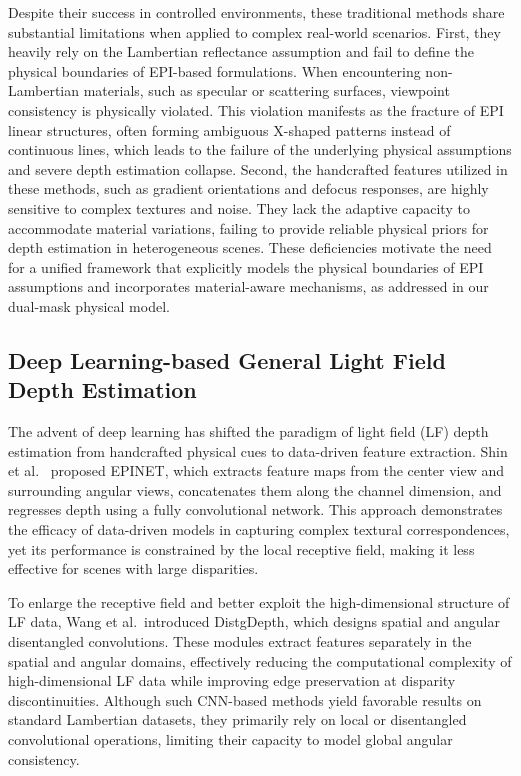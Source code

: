\documentclass[lettersize,journal]{IEEEtran}
\begin{document}
Despite their success in controlled environments, these traditional methods share substantial limitations when applied to complex real-world scenarios. First, they heavily rely on the Lambertian reflectance assumption and fail to define the physical boundaries of EPI-based formulations. When encountering non-Lambertian materials, such as specular or scattering surfaces, viewpoint consistency is physically violated. This violation manifests as the fracture of EPI linear structures, often forming ambiguous X-shaped patterns instead of continuous lines, which leads to the failure of the underlying physical assumptions and severe depth estimation collapse. Second, the handcrafted features utilized in these methods, such as gradient orientations and defocus responses, are highly sensitive to complex textures and noise. They lack the adaptive capacity to accommodate material variations, failing to provide reliable physical priors for depth estimation in heterogeneous scenes. These deficiencies motivate the need for a unified framework that explicitly models the physical boundaries of EPI assumptions and incorporates material-aware mechanisms, as addressed in our dual-mask physical model.

\subsection{Deep Learning-based General Light Field Depth Estimation}

The advent of deep learning has shifted the paradigm of light field (LF) depth estimation from handcrafted physical cues to data-driven feature extraction. Shin et al.\ \cite{dosovitskiy2021} proposed EPINET, which extracts feature maps from the center view and surrounding angular views, concatenates them along the channel dimension, and regresses depth using a fully convolutional network. This approach demonstrates the efficacy of data-driven models in capturing complex textural correspondences, yet its performance is constrained by the local receptive field, making it less effective for scenes with large disparities.

To enlarge the receptive field and better exploit the high-dimensional structure of LF data, Wang et al.\ introduced DistgDepth, which designs spatial and angular disentangled convolutions. These modules extract features separately in the spatial and angular domains, effectively reducing the computational complexity of high-dimensional LF data while improving edge preservation at disparity discontinuities. Although such CNN-based methods yield favorable results on standard Lambertian datasets, they primarily rely on local or disentangled convolutional operations, limiting their capacity to model global angular consistency.
\end{document}
